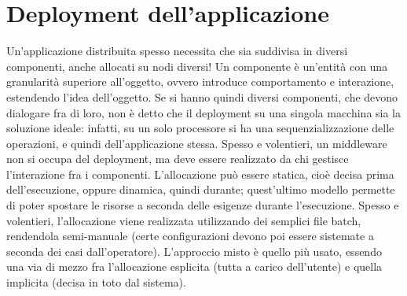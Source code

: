 \section{Deployment dell'applicazione}
Un'applicazione distribuita spesso necessita che sia suddivisa in diversi componenti, anche allocati su nodi diversi!
Un componente è un'entità con una granularità superiore all'oggetto, ovvero introduce comportamento e interazione,
estendendo l'idea dell'oggetto.
Se si hanno quindi diversi componenti, che devono dialogare fra di loro, non è detto che il deployment su una singola
macchina sia la soluzione ideale: infatti, su un solo processore si ha una sequenzializzazione delle operazioni, e
quindi dell'applicazione stessa.
Spesso e volentieri, un middleware non si occupa del deployment, ma deve essere realizzato da chi gestisce l'interazione
fra i componenti. L'allocazione può essere statica, cioè decisa prima dell'esecuzione, oppure dinamica, quindi
durante; quest'ultimo modello permette di poter spostare le risorse a seconda delle esigenze durante l'esecuzione.
Spesso e volentieri, l'allocazione viene realizzata utilizzando dei semplici file batch, rendendola semi-manuale (certe
configurazioni devono poi essere sistemate a seconda dei casi dall'operatore).
L'approccio misto è quello più usato, essendo una via di mezzo fra l'allocazione esplicita (tutta a carico dell'utente)
e quella implicita (decisa in toto dal sistema).

